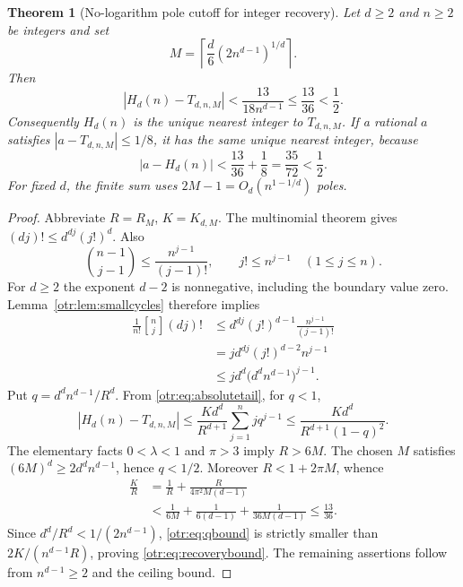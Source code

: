 \documentclass[11pt,a4paper]{article}
\newtheorem{theorem}{Theorem}[section]
\theoremstyle{definition}\newtheorem{definition}[theorem]{Definition}
\theoremstyle{remark}\newtheorem{remark}[theorem]{Remark}
\newcommand{\lam}{\lambda}
\newcommand{\St}[2]{\genfrac{[}{]}{0pt}{}{#1}{#2}}
\newcommand{\ceil}[1]{\left\lceil #1\right\rceil}
\begin{document}
\begin{theorem}[No-logarithm pole cutoff for integer recovery]\label{otr:thm:recover}
Let $d\ge2$ and $n\ge2$ be integers and set
\begin{equation}\label{otr:eq:cutoff}
 M=\ceil{\frac d6(2n^{d-1})^{1/d}}.
\end{equation}
Then
\begin{equation}\label{otr:eq:recoverybound}
 |H_d(n)-T_{d,n,M}|<\frac{13}{18n^{d-1}}\le\frac{13}{36}<\frac12.
\end{equation}
Consequently $H_d(n)$ is the unique nearest integer to $T_{d,n,M}$. If a rational $a$ satisfies $|a-T_{d,n,M}|\le1/8$, it has the same unique nearest integer, because
\[
 |a-H_d(n)|<\frac{13}{36}+\frac18=\frac{35}{72}<\frac12.
\]
For fixed $d$, the finite sum uses $2M-1=O_d(n^{1-1/d})$ poles.
\end{theorem}
\begin{proof}
Abbreviate $R=R_M$, $K=K_{d,M}$. The multinomial theorem gives $(dj)!\le d^{dj}(j!)^d$. Also
\[
 \binom{n-1}{j-1}\le\frac{n^{j-1}}{(j-1)!},\qquad
 j!\le n^{j-1}\quad(1\le j\le n).
\]
For $d\ge2$ the exponent $d-2$ is nonnegative, including the boundary value zero. Lemma~\ref{otr:lem:smallcycles} therefore implies
\begin{align*}
 \frac1{n!}\St nj(dj)!
 &\le d^{dj}(j!)^{d-1}\frac{n^{j-1}}{(j-1)!}\\
 &=j d^{dj}(j!)^{d-2}n^{j-1}\\
 &\le j d^d\bigl(d^dn^{d-1}\bigr)^{j-1}.
\end{align*}
Put $q=d^dn^{d-1}/R^d$. From \eqref{otr:eq:absolutetail}, for $q<1$,
\begin{equation}\label{otr:eq:qbound}
 |H_d(n)-T_{d,n,M}|
 \le\frac{Kd^d}{R^{d+1}}\sum_{j=1}^{n}j q^{j-1}
 \le\frac{Kd^d}{R^{d+1}(1-q)^2}.
\end{equation}
The elementary facts $0<\lam<1$ and $\pi>3$ imply $R>6M$. The chosen $M$ satisfies $(6M)^d\ge2d^dn^{d-1}$, hence $q<1/2$. Moreover $R<1+2\pi M$, whence
\begin{align}
 \frac KR
 &=\frac1R+\frac R{4\pi^2M(d-1)}\nonumber\\
 &<\frac1{6M}+\frac1{6(d-1)}+\frac1{36M(d-1)}
 \le\frac{13}{36}.\label{otr:eq:KR}
\end{align}
Since $d^d/R^d<1/(2n^{d-1})$, \eqref{otr:eq:qbound} is strictly smaller than $2K/(n^{d-1}R)$, proving \eqref{otr:eq:recoverybound}. The remaining assertions follow from $n^{d-1}\ge2$ and the ceiling bound.
\end{proof}
\end{document}
